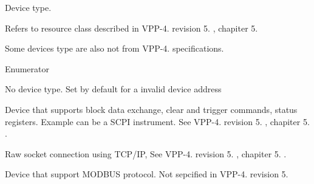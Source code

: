 Device type. 

Refers to resource class described in V\-P\-P-\/4. revision 5. , chapiter 5.

Some devices type are also not from V\-P\-P-\/4. specifications. \begin{Desc}
\item[Enumerator]\par
\begin{description}
\item[{\em 
\hypertarget{classmdt_device_address_a8e776267826886cd846fb2d75b9b7b2bab50339a10e1de285ac99d4c3990b8693}{N\-O\-N\-E}\label{classmdt_device_address_a8e776267826886cd846fb2d75b9b7b2bab50339a10e1de285ac99d4c3990b8693}
}]No device type. Set by default for a invalid device address \item[{\em 
\hypertarget{classmdt_device_address_a8e776267826886cd846fb2d75b9b7b2bac48b30e1372f2477bb18dc29450acdf4}{I\-N\-S\-T\-R}\label{classmdt_device_address_a8e776267826886cd846fb2d75b9b7b2bac48b30e1372f2477bb18dc29450acdf4}
}]Device that supports block data exchange, clear and trigger commands, status registers. Example can be a S\-C\-P\-I instrument. See V\-P\-P-\/4. revision 5. , chapiter 5. . \item[{\em 
\hypertarget{classmdt_device_address_a8e776267826886cd846fb2d75b9b7b2ba75fbea08c09e684e6b3f3961761354fa}{S\-O\-C\-K\-E\-T}\label{classmdt_device_address_a8e776267826886cd846fb2d75b9b7b2ba75fbea08c09e684e6b3f3961761354fa}
}]Raw socket connection using T\-C\-P/\-I\-P, See V\-P\-P-\/4. revision 5. , chapiter 5. . \item[{\em 
\hypertarget{classmdt_device_address_a8e776267826886cd846fb2d75b9b7b2ba7b25be9aa462c983626e10cc14056101}{M\-O\-D\-B\-U\-S}\label{classmdt_device_address_a8e776267826886cd846fb2d75b9b7b2ba7b25be9aa462c983626e10cc14056101}
}]Device that support M\-O\-D\-B\-U\-S protocol. Not sepcified in V\-P\-P-\/4. revision 5. \end{description}
\end{Desc}


